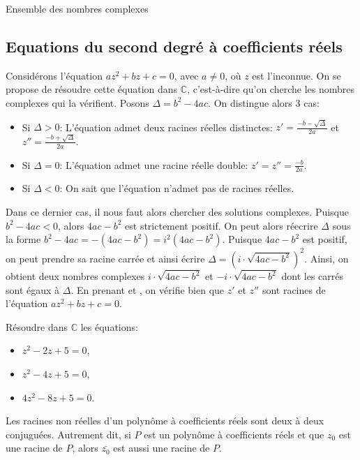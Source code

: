 \begin{chapter}{Ensemble des nombres complexes}
\subsection{Equations du second degr\'e \`a coefficients r\'eels}
%
%
Consid\'erons l'\'equation $a z^2 + b z + c = 0$, avec $a\neq0$, o\`u $z$ est l'inconnue.
On se propose de r\'esoudre cette \'equation dans $\mathbb{C}$, c'est-\`a-dire qu'on cherche les nombres complexes qui la v\'erifient.
Posons $\Delta = b^2 - 4 a c$.
On distingue alors 3 cas:
\begin{itemize}
\item Si $\Delta>0$:
     L'\'equation admet deux racines r\'eelles distinctes: $z' = \frac{-b - \sqrt{\Delta}}{2a}$ et $z'' = \frac{-b + \sqrt{\Delta}}{2a}$.
\item Si $\Delta=0$:
     L'\'equation admet une racine r\'eelle double: $z' = z'' = \frac{-b}{2a}$.
\item Si $\Delta<0$:
     On sait que l'\'equation n'admet pas de racines r\'eelles.
\end{itemize}
Dans ce dernier cas, il nous faut alors chercher des solutions complexes.
Puisque $b^2 - 4 ac<0$, alors $4ac - b^2$ est strictement positif.
On peut alors r\'eecrire $\Delta$ sous la forme $b^2 - 4ac = - (4ac - b^2) = i^2 (4ac - b^2)$.
Puisque $4ac - b^2$ est positif, on peut prendre sa racine carr\'ee et ainsi \'ecrire $\Delta = (i \cdot \sqrt{4ac - b^2} )^2$.
Ainsi, on obtient deux nombres complexes $i \cdot \sqrt{4ac - b^2}$ et $-i \cdot \sqrt{4ac - b^2}$ dont les carr\'es sont \'egaux \`a $\Delta$.
En prenant  et , on v\'erifie bien que $z'$ et $z''$ sont racines de l'\'equation $a z^2 + b z + c = 0$.

\begin{exe}
\label{exe:santatra second degre}
	R\'esoudre dans $\mathbb{C}$ les \'equations:
	\begin{itemize}
	\item $ z^2 - 2 z + 5 = 0 $,
	\item $ z^2 - 4 z + 5 = 0 $,
	\item $ 4 z^2 - 8 z + 5 = 0 $.
	\end{itemize}
\end{exe}
%
\begin{rmk}
      Les racines non r\'eelles d'un polyn\^ome \`a coefficients r\'eels sont deux \`a deux conjugu\'ees.
      Autrement dit, si $P$ est un polyn\^ome \`a coefficients r\'eels et que $z_0$ est une racine de $P$,
      alors $\bar{z_0}$ est aussi une racine de $P$.
\end{rmk}
%

\end{chapter}
